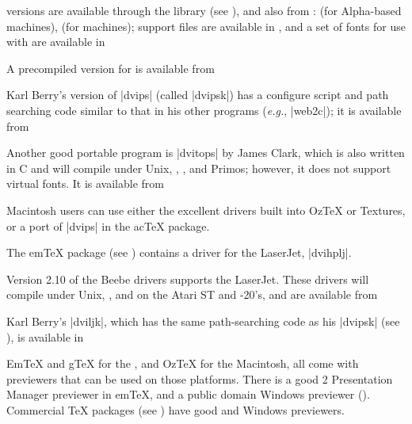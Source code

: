  versions are available through the  library
(see ), 
and also from :  (for Alpha-based machines),
 (for  machines); support files are available
in , and a set of fonts for use with
\LaTeXe{} are available in 

A precompiled version for \MSDOS{} is available from 

Karl Berry's version of \ProgName|dvips| (called \ProgName|dvipsk|)
has a configure script and path searching code similar to that in his
other programs (\emph{e.g.}, \ProgName|web2c|); it is available from

Another good portable program is \ProgName|dvitops| by James Clark,
which is also written in C and will compile under Unix, \MSDOS{}, ,
and Primos; however, it does not support virtual fonts.  It is
available from

Macintosh users can use either the excellent drivers built into Oz\TeX{}
or Textures, or a port of \ProgName|dvips| in the ac\TeX{} package.


The em\TeX{} package (see )
contains a driver for the LaserJet, \ProgName|dvihplj|.

Version 2.10 of the Beebe drivers supports the LaserJet. These drivers
will compile under Unix, , and on the Atari ST and
-20's, and are available from 

Karl Berry's \ProgName|dviljk|, which has the same path-searching code
as his \ProgName|dvipsk| (see
), is available in


Em\TeX{} and g\TeX{} for the , and Oz\TeX{} for the Macintosh, all
come with previewers that can be used on those platforms. There is a
good 2 Presentation Manager previewer in em\TeX{}, and a public
domain Windows previewer ().  Commercial  \TeX{}
packages  (see )
have good \MSDOS{} and Windows previewers.

